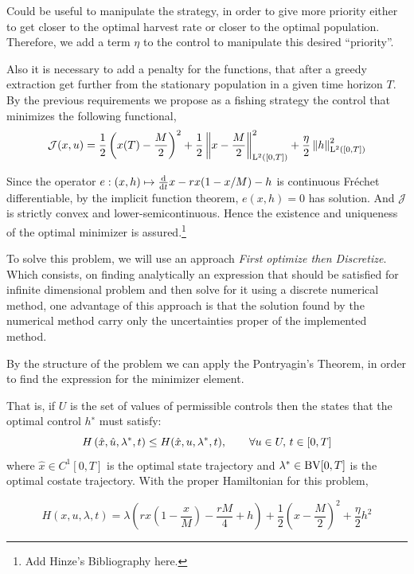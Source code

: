 Could be useful to manipulate the strategy, in order to give more priority either to get closer to the optimal harvest rate or closer to the optimal population. Therefore, we add a term $\eta$ to the control to manipulate this desired ``priority''. 

Also it is necessary to add a penalty for the functions, that after a greedy extraction get further from the stationary population in a given time horizon $T$. By the previous requirements we propose as a fishing strategy the control that minimizes the following  functional,
\begin{equation}
\mathcal{J}(x,u)=\frac{1}{2} \left(x(T)-\frac{M}{2}\right)^2+\frac{1}{2}\left\lVert x-\frac{M}{2} \right\rVert^2_{\mathrm{L}^2([0,T])}+\frac{\eta}{2}\left\lVert h \right\rVert^2_{\mathrm{L}^2([0,T])}
\end{equation}

Since the operator $e:(x,h)\mapsto\frac{\mathrm{d} }{{\mathrm{d} t}}x-rx(1-x/M)-h$ is continuous Fr\'echet differentiable, by the implicit function theorem, $e(x,h)=0$ has solution. And $\mathcal{J}$ is strictly convex and lower-semicontinuous. Hence the existence and uniqueness of the optimal minimizer is assured.\footnote{Add Hinze's Bibliography here.}

To solve this problem, we will use an approach \textit{First optimize then Discretize}. Which consists, on finding analytically an expression that should be satisfied for infinite dimensional problem and then solve for it using a discrete numerical method, one advantage of this approach is that the solution found by the numerical method carry only the uncertainties proper of the implemented method. 


By the structure of the problem we can apply the Pontryagin's Theorem, in order to find the expression for the minimizer element.

That is, if $U$ is the set of values of permissible controls then the states that the optimal control $h^∗$ must satisfy:
\begin{equation}
H\left( \hat{x}, \hat{u}, {\lambda}^{\ast}, t \right) \leq H(\hat{x},u, {\lambda}^{\ast}, t), \qquad \forall u \in U,\, t \in [0, T]	\label{eq: HamiltonianOptimalCondition.}
\end{equation}	
where $\hat{x} \in C^1[0, T]$ is the optimal state trajectory and ${\lambda}^{\ast} \in \mathrm{BV}[0, T]$ is the optimal costate trajectory. With the proper Hamiltonian for this problem,

\begin{equation}
H\left( x, u, \lambda, t \right)=\lambda\left(	rx\left(1-\frac{x}{M}\right)-\frac{rM}{4}+h\right)+\frac{1}{2}\left(x-\frac{M}{2}\right)^2+\frac{\eta}{2}h^2
\end{equation}

